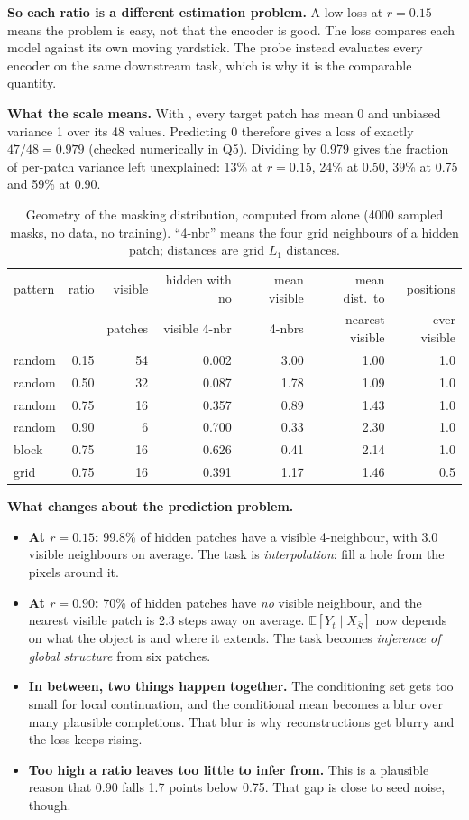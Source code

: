 \documentclass[11pt]{article}
\newcommand{\run}[1]{\texttt{\detokenize{#1}}}
\newcommand{\E}{\mathbb{E}}
\begin{document}
\textbf{So each ratio is a different estimation problem.} A low loss at $r=0.15$ means the problem is easy, not that the encoder is good. The loss compares each model against its own moving yardstick. The probe instead evaluates every encoder on the same downstream task, which is why it is the comparable quantity.

\textbf{What the scale means.} With \run{norm_pix}, every target patch has mean 0 and unbiased variance 1 over its 48 values. Predicting 0 therefore gives a loss of exactly $47/48=0.979$ (checked numerically in Q5). Dividing by 0.979 gives the fraction of per-patch variance left unexplained: 13\% at $r=0.15$, 24\% at 0.50, 39\% at 0.75 and 59\% at 0.90.

\begin{table}[H]
\centering\small
\begin{tabular}{lrrrrrr}
\toprule
pattern & ratio & visible & hidden with no & mean visible & mean dist.\ to & positions\\
        &       & patches & visible 4-nbr & 4-nbrs & nearest visible & ever visible\\
\midrule
random & 0.15 & 54 & 0.002 & 3.00 & 1.00 & 1.0\\
random & 0.50 & 32 & 0.087 & 1.78 & 1.09 & 1.0\\
random & 0.75 & 16 & 0.357 & 0.89 & 1.43 & 1.0\\
random & 0.90 &  6 & 0.700 & 0.33 & 2.30 & 1.0\\
block  & 0.75 & 16 & 0.626 & 0.41 & 2.14 & 1.0\\
grid   & 0.75 & 16 & 0.391 & 1.17 & 1.46 & 0.5\\
\bottomrule
\end{tabular}
\caption{Geometry of the masking distribution, computed from \run{masking.py} alone (4000 sampled masks, no data, no training). ``4-nbr'' means the four grid neighbours of a hidden patch; distances are grid $L_1$ distances.}
\label{tab:geom}
\end{table}

\textbf{What changes about the prediction problem.}
\begin{itemize}
  \item \textbf{At $r=0.15$:} 99.8\% of hidden patches have a visible 4-neighbour, with 3.0 visible neighbours on average. The task is \emph{interpolation}: fill a hole from the pixels around it.
  \item \textbf{At $r=0.90$:} 70\% of hidden patches have \emph{no} visible neighbour, and the nearest visible patch is 2.3 steps away on average. $\E[Y_t\mid X_{\bar S}]$ now depends on what the object is and where it extends. The task becomes \emph{inference of global structure} from six patches.
  \item \textbf{In between, two things happen together.} The conditioning set gets too small for local continuation, and the conditional mean becomes a blur over many plausible completions. That blur is why reconstructions get blurry and the loss keeps rising.
  \item \textbf{Too high a ratio leaves too little to infer from.} This is a plausible reason that 0.90 falls 1.7 points below 0.75. That gap is close to seed noise, though.
\end{itemize}
\end{document}
